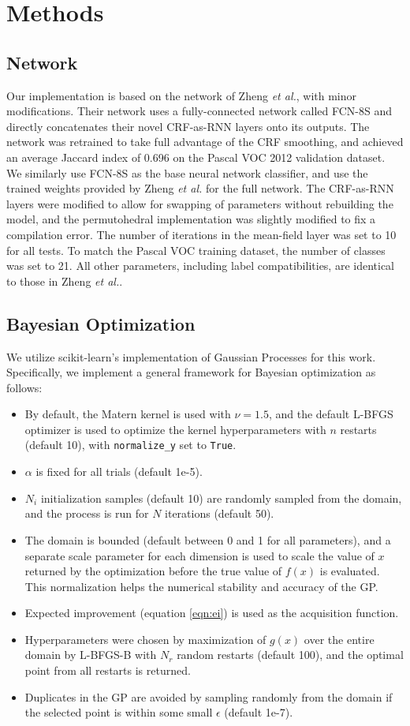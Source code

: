 \documentclass[10pt,twocolumn,letterpaper]{article}
\begin{document}
\section{Methods}

\subsection{Network}
Our implementation is based on the network of Zheng \textit{et al.}, with minor modifications. Their network uses a fully-connected network called FCN-8S and directly concatenates their novel CRF-as-RNN layers onto its outputs. The network was retrained to take full advantage of the CRF smoothing, and achieved an average Jaccard index of 0.696 on the Pascal VOC 2012 validation dataset. We similarly use FCN-8S as the base neural network classifier, and use the trained weights provided by Zheng \textit{et al.} for the full network. The CRF-as-RNN layers were modified to allow for swapping of parameters without rebuilding the model, and the permutohedral implementation was slightly modified to fix a compilation error. The number of iterations in the mean-field layer was set to 10 for all tests. To match the Pascal VOC training dataset, the number of classes was set to 21. All other parameters, including label compatibilities, are identical to those in Zheng \textit{et al.}. 

\subsection{Bayesian Optimization}
We utilize scikit-learn's implementation of Gaussian Processes for this work. Specifically, we implement a general framework for Bayesian optimization as follows:
\begin{itemize}
\item By default, the Matern kernel is used with $\nu = 1.5$, and the default L-BFGS optimizer is used to optimize the kernel hyperparameters with $n$ restarts (default 10), with \texttt{normalize\_y} set to \texttt{True}. 
\item $\alpha$ is fixed for all trials (default 1e-5). 
\item $N_i$ initialization samples (default 10) are randomly sampled from the domain, and the process is run for $N$ iterations (default 50). 
\item The domain is bounded (default between 0 and 1 for all parameters), and a separate scale parameter for each dimension is used to scale the value of $x$ returned by the optimization before the true value of $f(x)$ is evaluated. This normalization helps the numerical stability and accuracy of the GP.
\item Expected improvement (equation \ref{eqn:ei}) is used as the acquisition function. 
\item Hyperparameters were chosen by maximization of $g(x)$ over the entire domain by L-BFGS-B with $N_r$ random restarts (default 100), and the optimal point from all restarts is returned.
\item Duplicates in the GP are avoided by sampling randomly from the domain if the selected point is within some small $\epsilon$ (default 1e-7). 
\end{itemize}
\end{document}
